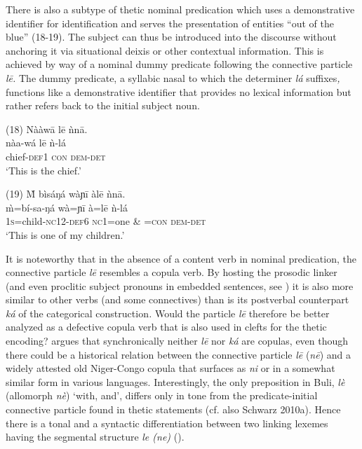 \documentclass[output=paper]{langsci/langscibook}
\begin{document}
There is also a subtype of thetic nominal predication which uses a demonstrative identifier for identification and serves the presentation of entities “out of the blue” (18-19). The subject can thus be introduced into the discourse without anchoring it via situational deixis or other contextual information. This is achieved by way of a nominal dummy predicate following the connective particle \textit{l\={e}. }The dummy predicate, a syllabic nasal to which the determiner \textit{lá }suffixes\textit{, }functions like a demonstrative identifier that provides no lexical information but rather refers back to the initial subject noun.

\ea
\glll \textup{(18)}  Nààw\={a}    l\={e}  ǹn\={a}.\\
  \textup{  nàa-wá    l\={e}  ǹ-lá}\\
       chief-\textsc{def1}  \textsc{con}  \textsc{dem}{}-\textsc{det}\\
\glt ‘This is the chief.’ \citep[88]{Schwarz2007}
\z

\ea
\glll \textup{(19)}  \`{M}   bìsáŋá    wàɲ\={i}    àl\={e}    ǹn\={a}.\\
  \textup{  \`{m}=bí-sa-ŋá    wà=ɲ\={i}    à=l\={e}    ǹ-lá}\\
       1\textsc{s}=child-\textsc{nc}12-\textsc{def}6  \textsc{nc}1=one  \& =\textsc{con}  \textsc{dem-det}\\
\glt ‘This is one of my children.’ \citep[88]{Schwarz2007}
\z

It is noteworthy that in the absence of a content verb in nominal predication, the connective particle \textit{l\={e}} resembles a copula verb. By hosting the prosodic linker (and even proclitic subject pronouns in embedded sentences, see ) it is also more similar to other verbs (and some connectives) than is its postverbal counterpart \textit{ká }of the categorical construction\textit{. }Would the particle \textit{l\={e} }therefore be better analyzed as a defective copula verb that is also used in clefts for the thetic encoding? \citet{Schwarz2009} argues that synchronically neither \textit{l\={e} }nor \textit{ká} are copulas, even though there could be a historical relation between the connective particle \textit{l\={e} }(\textit{n\={e}}) and a widely attested old Niger-Congo copula that surfaces as \textit{ni }or in a somewhat similar form in various languages. Interestingly, the only preposition in Buli, \textit{lè }(allomorph \textit{nè}) ‘with, and’, differs only in tone from the predicate-initial connective particle found in thetic statements (cf. also Schwarz 2010a). Hence there is a tonal and a syntactic differentiation between two linking lexemes having the segmental structure \textit{le (ne) }().
\end{document}
